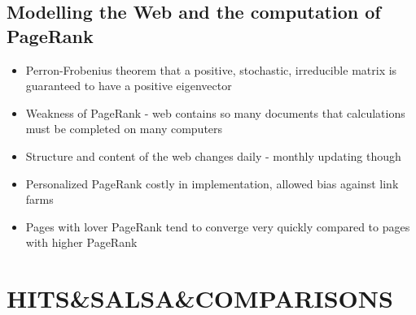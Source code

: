 \documentclass[11pt]{report}
\begin{document}
\section{Modelling the Web and the computation of PageRank}
\begin{itemize}
\item Perron-Frobenius theorem that a positive, stochastic, irreducible matrix is guaranteed to have a positive eigenvector
\item Weakness of PageRank - web contains so many documents that calculations must be completed on many computers
\item Structure and content of the web changes daily - monthly updating though
\item Personalized PageRank costly in implementation, allowed bias against link farms
\item Pages with lover PageRank tend to converge very quickly compared to pages with higher PageRank
\end{itemize}
\chapter{HITS\&SALSA\&COMPARISONS}
\end{document}

